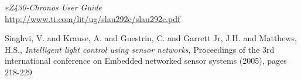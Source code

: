 \begin{thebibliography}{99}
 \textit{eZ430-Chronos User Guide} \\ \url{http://www.ti.com/lit/ug/slau292c/slau292c.pdf}

 Singhvi, V. and Krause, A. and Guestrin, C. and Garrett Jr, J.H. and Matthews, H.S., \textit{Intelligent light control using sensor networks}, Proceedings of the 3rd international conference on Embedded networked sensor systems (2005), pages 218-229

\end{thebibliography}



